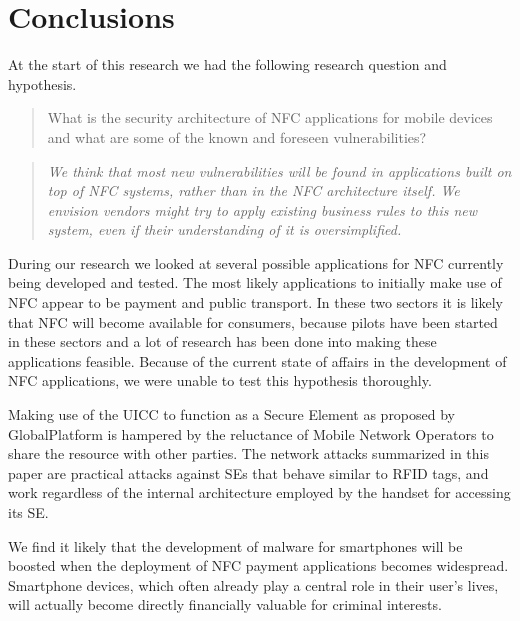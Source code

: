 \section{Conclusions}
\label{sec:conclusions}

At the start of this research we had the following research question and hypothesis. 

\begin{quote}
What is the security architecture of NFC applications for mobile devices and what are some of the known and foreseen vulnerabilities?
\end{quote}

\begin{quote}
\textit{We think that most new vulnerabilities will be found in applications built on top of NFC systems, rather than in the NFC architecture itself.
We envision vendors might try to apply existing business rules to this new system, even if their understanding of it is oversimplified.}
\end{quote}

During our research we looked at several possible applications for NFC currently being developed and tested.
The most likely applications to initially make use of NFC appear to be payment and public transport.
In these two sectors it is likely that NFC will become available for consumers, because pilots have been started in these sectors and a lot of research has been done into making these applications feasible.
Because of the current state of affairs in the development of NFC applications, we were unable to test this hypothesis thoroughly.

Making use of the UICC to function as a Secure Element as proposed by GlobalPlatform is hampered by the reluctance of Mobile Network Operators to share the resource with other parties.
The network attacks summarized in this paper are practical attacks against SEs that behave similar to RFID tags, and work regardless of the internal architecture employed by the handset for accessing its SE.

We find it likely that the development of malware for smartphones will be boosted when the deployment of NFC payment applications becomes widespread.
Smartphone devices, which often already play a central role in their user's lives, will actually become directly financially valuable for criminal interests.



